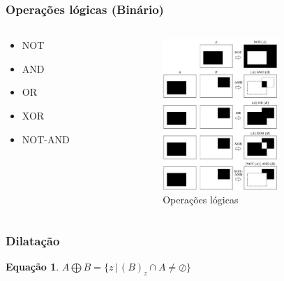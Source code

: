 \documentclass[aspectratio=169]{beamer}
\theoremstyle{Definition}
\newtheorem{eq}[theorem]{Equa\c c\~ao}
\begin{document}
\begin{frame}
	\frametitle{Operações lógicas (Binário) }
	
	\begin{columns}
		\begin{column}{0.3\textwidth}
		   \begin{itemize}
				\item NOT
				\item AND
				\item OR
				\item XOR
				\item NOT-AND
			\end{itemize}
		\end{column}
		\begin{column}{0.7\textwidth}  %
    		\begin{figure}[h]
	   	 		\includegraphics[width=4.4cm]{imagens/logical}
			    \caption{Operações lógicas}\label{figLogical}
	  		\end{figure}
		\end{column}
	\end{columns}
\end{frame}

\begin{frame}
	\frametitle{Dilatação}
	
	\begin{eq}
    	$A \bigoplus  B = \{z \,|\, (B)_z  \cap A \neq \oslash \}$ 
	\end{eq}
\end{frame}
\end{document}
